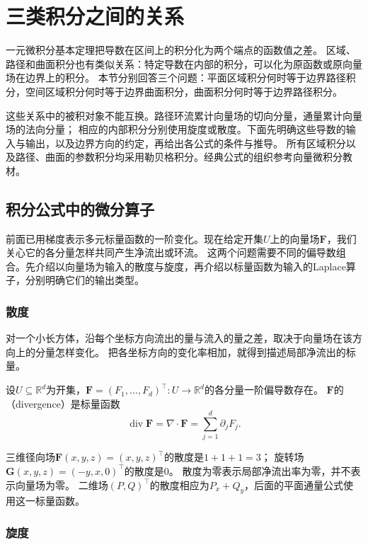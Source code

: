 \section{三类积分之间的关系}
\label{sec:multivariable-boundary-relations}

一元微积分基本定理把导数在区间上的积分化为两个端点的函数值之差。
区域、路径和曲面积分也有类似关系：特定导数在内部的积分，可以化为原函数或原向量场在边界上的积分。
本节分别回答三个问题：平面区域积分何时等于边界路径积分，空间区域积分何时等于边界曲面积分，曲面积分何时等于边界路径积分。

这些关系中的被积对象不能互换。路径环流累计向量场的切向分量，通量累计向量场的法向分量；
相应的内部积分分别使用旋度或散度。下面先明确这些导数的输入与输出，以及边界方向的约定，再给出各公式的条件与推导。
所有区域积分以及路径、曲面的参数积分均采用勒贝格积分。经典公式的组织参考向量微积分教材。

\subsection{积分公式中的微分算子}

前面已用梯度表示多元标量函数的一阶变化。现在给定开集$U$上的向量场$\bm F$，我们关心它的各分量怎样共同产生净流出或环流。
这两个问题需要不同的偏导数组合。先介绍以向量场为输入的散度与旋度，再介绍以标量函数为输入的Laplace算子，分别明确它们的输出类型。

\subsubsection{散度}

对一个小长方体，沿每个坐标方向流出的量与流入的量之差，取决于向量场在该方向上的分量怎样变化。
把各坐标方向的变化率相加，就得到描述局部净流出的标量。
\begin{definition}[散度]
\label{def:multivariable-divergence}
设$U\subseteq\mathbb R^d$为开集，$\bm F=(F_1,\ldots,F_d)^\top:U\to\mathbb R^d$的各分量一阶偏导数存在。
$\bm F$的（divergence）是标量函数
\[
 \operatorname{div}\bm F
 =\nabla\mathbin{\cdot}\bm F
 =\sum_{j=1}^d\partial_jF_j.
\]
\end{definition}
三维径向场$\bm F(x,y,z)=(x,y,z)^\top$的散度是$1+1+1=3$；
旋转场$\bm G(x,y,z)=(-y,x,0)^\top$的散度是$0$。
散度为零表示局部净流出率为零，并不表示向量场为零。
二维场$(P,Q)^\top$的散度相应为$P_x+Q_y$，后面的平面通量公式使用这一标量函数。

\subsubsection{旋度}


